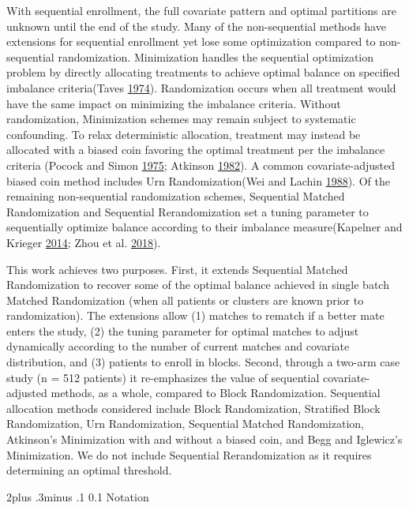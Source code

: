 \documentclass[12pt,oneside]{book}
\makeatletter
\newlength{\li}\setlength{\li}{14.48pt}
\newlength{\di}\setlength{\di}{-3.5mm}
\renewcommand\section{ \@startsection {section}{1}{\z@}%
    {2\@bls  plus .3\@bls minus .1\@bls}%
    {0.1\@bls}%
    {\centering\normalfont}}
\theoremstyle{definition}
\theoremstyle{definition}
\theoremstyle{definition}
\theoremstyle{remark}
\makeatother
\begin{document}
With sequential enrollment, the full covariate pattern and optimal
partitions are unknown until the end of the study. Many of the
non-sequential methods have extensions for sequential enrollment yet
lose some optimization compared to non-sequential randomization.
Minimization handles the sequential optimization problem by directly
allocating treatments to achieve optimal balance on specified imbalance
criteria(Taves \protect\hyperlink{ref-Taves:1974hn}{1974}).
Randomization occurs when all treatment would have the same impact on
minimizing the imbalance criteria. Without randomization, Minimization
schemes may remain subject to systematic confounding. To relax
deterministic allocation, treatment may instead be allocated with a
biased coin favoring the optimal treatment per the imbalance criteria
(Pocock and Simon \protect\hyperlink{ref-Pocock:1975wd}{1975}; Atkinson
\protect\hyperlink{ref-Atkinson:1982kt}{1982}). A common
covariate-adjusted biased coin method includes Urn Randomization(Wei and
Lachin \protect\hyperlink{ref-Wei:1988if}{1988}). Of the remaining
non-sequential randomization schemes, Sequential Matched Randomization
and Sequential Rerandomization set a tuning parameter to sequentially
optimize balance according to their imbalance measure(Kapelner and
Krieger \protect\hyperlink{ref-Kapelner:2014cu}{2014}; Zhou et al.
\protect\hyperlink{ref-Quan:SeqRerand}{2018}).

This work achieves two purposes. First, it extends Sequential Matched
Randomization to recover some of the optimal balance achieved in single
batch Matched Randomization (when all patients or clusters are known
prior to randomization). The extensions allow (1) matches to rematch if
a better mate enters the study, (2) the tuning parameter for optimal
matches to adjust dynamically according to the number of current matches
and covariate distribution, and (3) patients to enroll in blocks.
Second, through a two-arm case study (n = 512 patients) it re-emphasizes
the value of sequential covariate-adjusted methods, as a whole, compared
to Block Randomization. Sequential allocation methods considered include
Block Randomization, Stratified Block Randomization, Urn Randomization,
Sequential Matched Randomization, Atkinson's Minimization with and
without a biased coin, and Begg and Iglewicz's Minimization. We do not
include Sequential Rerandomization as it requires determining an optimal
threshold.

\hypertarget{notation}{%
\section{Notation}\label{notation}}
\end{document}

